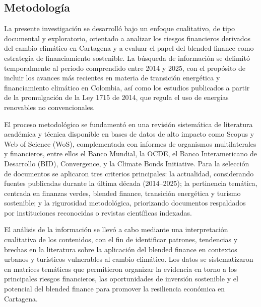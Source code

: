 \subsection{Metodología}

La presente investigación se desarrolló bajo un enfoque cualitativo, de tipo documental y exploratorio, orientado a analizar los riesgos financieros derivados del cambio climático en Cartagena y a evaluar el papel del blended finance como estrategia de financiamiento sostenible. La búsqueda de información se delimitó temporalmente al periodo comprendido entre 2014 y 2025, con el propósito de incluir los avances más recientes en materia de transición energética y financiamiento climático en Colombia, así como los estudios publicados a partir de la promulgación de la Ley 1715 de 2014, que regula el uso de energías renovables no convencionales.

El proceso metodológico se fundamentó en una revisión sistemática de literatura académica y técnica disponible en bases de datos de alto impacto como Scopus y Web of Science (WoS), complementada con informes de organismos multilaterales y financieros, entre ellos el Banco Mundial, la OCDE, el Banco Interamericano de Desarrollo (BID), Convergence, y la Climate Bonds Initiative. Para la selección de documentos se aplicaron tres criterios principales: la actualidad, considerando fuentes publicadas durante la última década (2014–2025); la pertinencia temática, centrada en finanzas verdes, blended finance, transición energética y turismo sostenible; y la rigurosidad metodológica, priorizando documentos respaldados por instituciones reconocidas o revistas científicas indexadas.

El análisis de la información se llevó a cabo mediante una interpretación cualitativa de los contenidos, con el fin de identificar patrones, tendencias y brechas en la literatura sobre la aplicación del blended finance en contextos urbanos y turísticos vulnerables al cambio climático. Los datos se sistematizaron en matrices temáticas que permitieron organizar la evidencia en torno a los principales riesgos financieros, las oportunidades de inversión sostenible y el potencial del blended finance para promover la resiliencia económica en Cartagena.